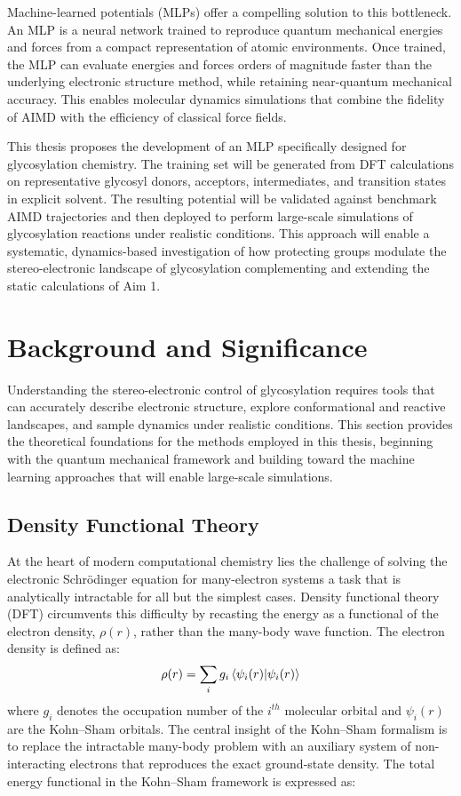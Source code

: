 \documentclass{article}
\begin{document}
Machine-learned potentials (MLPs) offer a compelling solution to this bottleneck. An MLP is a neural network trained to reproduce quantum mechanical energies and forces from a compact representation of atomic environments. Once trained, the MLP can evaluate energies and forces orders of magnitude faster than the underlying electronic structure method, while retaining near-quantum mechanical accuracy. This enables molecular dynamics simulations that combine the fidelity of AIMD with the efficiency of classical force fields.

This thesis proposes the development of an MLP specifically designed for glycosylation chemistry. The training set will be generated from DFT calculations on representative glycosyl donors, acceptors, intermediates, and transition states in explicit solvent. The resulting potential will be validated against benchmark AIMD trajectories and then deployed to perform large-scale simulations of glycosylation reactions under realistic conditions. This approach will enable a systematic, dynamics-based investigation of how protecting groups modulate the stereo-electronic landscape of glycosylation complementing and extending the static calculations of Aim 1.

\section{Background and Significance}

Understanding the stereo-electronic control of glycosylation requires tools that can accurately describe electronic structure, explore conformational and reactive landscapes, and sample dynamics under realistic conditions. This section provides the theoretical foundations for the methods employed in this thesis, beginning with the quantum mechanical framework and building toward the machine learning approaches that will enable large-scale simulations.

\subsection{Density Functional Theory}

At the heart of modern computational chemistry lies the challenge of solving the electronic Schr\"{o}dinger equation for many-electron systems a task that is analytically intractable for all but the simplest cases. Density functional theory (DFT) circumvents this difficulty by recasting the energy as a functional of the electron density, $\rho(r)$, rather than the many-body wave function. The electron density is defined as:
\begin{equation}
    \rho(r) = \sum_i g_i \braket{\psi_i(r)}{\psi_i(r)}
\end{equation}
where $g_i$ denotes the occupation number of the $i^{th}$ molecular orbital and $\psi_i(r)$ are the Kohn--Sham orbitals. The central insight of the Kohn--Sham formalism is to replace the intractable many-body problem with an auxiliary system of non-interacting electrons that reproduces the exact ground-state density. The total energy functional in the Kohn--Sham framework is expressed as:
\end{document}
